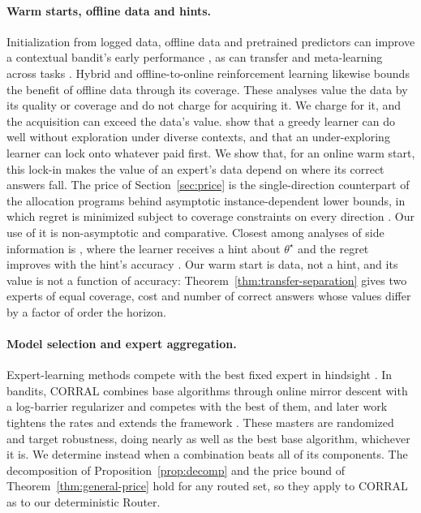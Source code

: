 \documentclass[anon]{alt2027} %
\newif\ifrevmarks\revmarkstrue
\newenvironment{revised}{\ifrevmarks\color{revcolor}\fi}{}
\begin{document}
\begin{revised}
\paragraph{Warm starts, offline data and hints.}
Initialization from logged data, offline data and pretrained predictors can
improve a contextual bandit's early performance
\citep{zhang2019warm,riquelme2018deep}, as can transfer and meta-learning
across tasks \citep{lazaric2012transfer,gentile2014online,sharaf2019meta}.
Hybrid and offline-to-online reinforcement learning
\citep{song2022hybrid,wagenmaker2023leveraging,hao2023leveraging} likewise
bounds the benefit of offline data through its coverage. These analyses
value the data by its quality or coverage and do not charge for acquiring
it. We charge for it, and the acquisition can exceed the data's value.
\citet{bastani2021mostly} show that a greedy learner can do well without
exploration under diverse contexts, and that an under-exploring learner can
lock onto whatever paid first. We show that, for an online warm start, this
lock-in makes the value of an expert's data depend on where its correct
answers fall. The price of Section~\ref{sec:price} is the single-direction
counterpart of the allocation programs behind asymptotic instance-dependent
lower bounds, in which regret is minimized subject to coverage constraints
on every direction \citep{graves1997asymptotically,lattimore2017end}. Our
use of it is non-asymptotic and comparative. Closest among analyses of side
information is \citet{cutkosky2022leveraging}, where the learner receives a
hint about $\theta^\star$ and the regret improves with the hint's accuracy
\citep[see also][]{rakhlin2013online}. Our warm start is data, not a hint,
and its value is not a function of accuracy:
Theorem~\ref{thm:transfer-separation} gives two experts of equal coverage,
cost and number of correct answers whose values differ by a factor of order
the horizon.

\paragraph{Model selection and expert aggregation.}
Expert-learning methods compete with the best fixed expert in hindsight
\citep{auer2002nonstochastic}. In bandits, CORRAL
\citep{agarwal2017corralling} combines base algorithms through online mirror
descent with a log-barrier regularizer and competes with the best of them,
and later work tightens the rates and extends the framework
\citep{pacchiano2020model,marinov2021pareto,zhu2022pareto,zhu2022near,dann2024data}.
These masters are randomized and target robustness, doing nearly as well as
the best base algorithm, whichever it is. We determine instead when a
combination beats all of its components. The decomposition of
Proposition~\ref{prop:decomp} and the price bound of
Theorem~\ref{thm:general-price} hold for any routed set, so they apply to
CORRAL as to our deterministic Router.


\end{revised}
\end{document}
